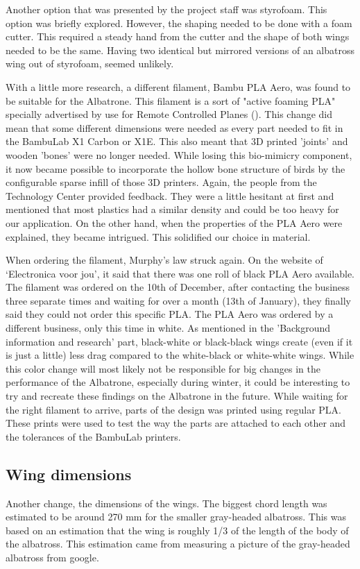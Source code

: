Another option that was presented by the project staff was styrofoam. This option was briefly explored. However, the shaping needed to be done with a foam cutter. This required a steady hand from the cutter and the shape of both wings needed to be the same. Having two identical but mirrored versions of an albatross wing out of styrofoam, seemed unlikely.

With a little more research, a different filament, Bambu PLA Aero, was found to be suitable for the Albatrone. This filament is a sort of "active foaming PLA" specially advertised by use for Remote Controlled Planes (\cite{PLA_Aero}). This change did mean that some different dimensions were needed as every part needed to fit in the BambuLab X1 Carbon or X1E. This also meant that 3D printed 'joints' and wooden 'bones' were no longer needed. While losing this bio-mimicry component, it now became possible to incorporate the hollow bone structure of birds by the configurable sparse infill of those 3D printers. Again, the people from the Technology Center provided feedback. They were a little hesitant at first and mentioned that most plastics had a similar density and could be too heavy for our application. On the other hand, when the properties of the PLA Aero were explained, they became intrigued. This solidified our choice in material.

When ordering the filament, Murphy's law struck again. On the website of `Electronica voor jou', it said that there was one roll of black PLA Aero available. The filament was ordered on the 10th of December, after contacting the business three separate times and waiting for over a month (13th of January), they finally said they could not order this specific PLA. The PLA Aero was ordered by a different business, only this time in white. As mentioned in the 'Background information and research' part, black-white or black-black wings create (even if it is just a little) less drag compared to the white-black or white-white wings. While this color change will most likely not be responsible for big changes in the performance of the Albatrone, especially during winter, it could be interesting to try and recreate these findings on the Albatrone in the future. While waiting for the right filament to arrive, parts of the design was printed using regular PLA. These prints were used to test the way the parts are attached to each other and the tolerances of the BambuLab printers.


\subsection{Wing dimensions} 
Another change, the dimensions of the wings. The biggest chord length was estimated to be around 270 mm for the smaller gray-headed albatross. This was based on an estimation that the wing is roughly 1/3 of the length of the body of the albatross. This estimation came from measuring a picture of the gray-headed albatross from google. 

